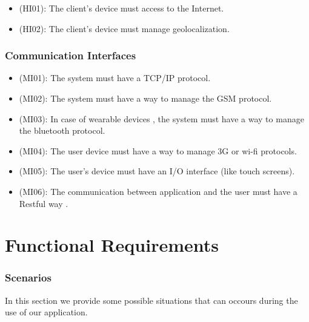 \documentclass[a4paper]{book}
\begin{document}
\begin{itemize}
\item (HI01): The client's device must access to the Internet.
\item (HI02): The client's device must manage geolocalization. 
\end{itemize}

\section{Communication Interfaces}

\begin{itemize}
\item (MI01): The system must have a TCP/IP protocol.
\item (MI02): The system must have a way to manage the GSM protocol.
\item (MI03): In case of wearable devices , the system must have a way to manage the bluetooth protocol.
\item (MI04): The user device must have a way to manage 3G or wi-fi protocols.
\item (MI05): The user's device must have an I/O interface (like touch screens).
\item (MI06): The communication between application and the user must have a Restful way .
\end{itemize}

\part{Functional Requirements}

\section{Scenarios}
In this section we provide some possible situations that can occours during the use of our application.
\end{document}

